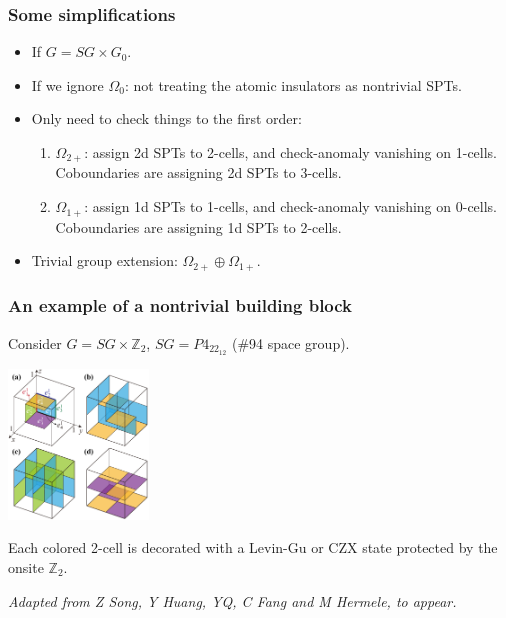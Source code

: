 \documentclass[xcolor=table, 10pt, aspectratio=43]{beamer}
\begin{document}
\begin{frame}
\frametitle{Some simplifications}
\begin{itemize}
\item If $G = SG\times G_0$.
\item If we ignore $\Omega_0$: not treating the atomic insulators as nontrivial SPTs.
\item Only need to check things to the first order:
\begin{enumerate}
\item $\Omega_{2+}$: assign 2d SPTs to 2-cells, and check-anomaly vanishing on 1-cells. Coboundaries are assigning 2d SPTs to 3-cells.
\item $\Omega_{1+}$: assign 1d SPTs to 1-cells, and check-anomaly vanishing on 0-cells. Coboundaries are assigning 1d SPTs to 2-cells.
\end{enumerate}
\item Trivial group extension: $\Omega_{2+}\oplus\Omega_{1+}$.
\end{itemize}
\end{frame}

\begin{frame}
\frametitle{An example of a nontrivial building block}
Consider $G=SG\times\mathbb Z_2$, $SG=P4_22_12$ (\#94 space group).
\begin{center}
\includegraphics[height=4cm]{blocks}
\end{center}
Each colored 2-cell is decorated with a Levin-Gu or CZX state protected by the onsite $\mathbb Z_2$.

\emph{\small Adapted from Z Song, Y Huang, YQ, C Fang and M Hermele, to appear.}
\end{frame}
\end{document}
